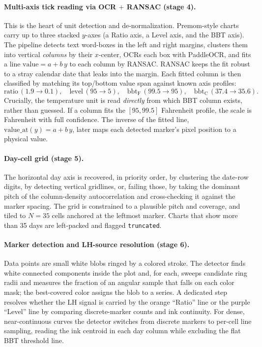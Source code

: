 \documentclass[11pt,a4paper]{article}
\newcommand{\code}[1]{\texttt{\small #1}}
\begin{document}
\paragraph{Multi-axis tick reading via OCR $+$ RANSAC (stage 4).}
This is the heart of unit detection and de-normalization. Premom-style
charts carry up to three stacked $y$-axes (a Ratio axis, a Level axis, and
the BBT axis). The pipeline detects text word-boxes in the left and right
margins, clusters them into vertical \emph{columns} by their $x$-center,
OCRs each box with PaddleOCR, and fits a line $\text{value} = a + b\,y$ to
each column by RANSAC. RANSAC keeps the fit robust to a stray calendar
date that leaks into the margin. Each fitted column is then classified by
matching its top/bottom value span against known axis profiles:
\[
\text{ratio}\,(1.9{\to}0.1),\quad
\text{level}\,(95{\to}5),\quad
\text{bbt}_{\text{F}}\,(99.5{\to}95),\quad
\text{bbt}_{\text{C}}\,(37.4{\to}35.6).
\]
Crucially, the temperature unit is read \emph{directly} from which BBT
column exists, rather than guessed. If a column fits the $[95,99.5]$
Fahrenheit profile, the scale is Fahrenheit with full confidence. The
inverse of the fitted line, $\text{value\_at}(y) = a + b\,y$, later maps
each detected marker's pixel position to a physical value.

\paragraph{Day-cell grid (stage 5).}
The horizontal day axis is recovered, in priority order, by clustering the
date-row digits, by detecting vertical gridlines, or, failing those, by
taking the dominant pitch of the column-density autocorrelation and
cross-checking it against the marker spacing. The grid is constrained to a
plausible pitch and coverage, and tiled to $N\!=\!35$ cells anchored at the
leftmost marker. Charts that show more than 35 days are left-packed and
flagged \code{truncated}.

\paragraph{Marker detection and LH-source resolution (stage 6).}
Data points are small white blobs ringed by a colored stroke. The detector finds
white connected components inside the plot and, for each, sweeps candidate ring
radii and measures the fraction of an angular sample that falls on each color
mask; the best-covered color assigns the blob to a series. A dedicated step
resolves whether the LH signal is carried by the orange ``Ratio'' line or the
purple ``Level'' line by comparing discrete-marker counts and ink continuity.
For dense, near-continuous curves the detector switches from discrete markers to
per-cell line sampling, reading the ink centroid in each day column while
excluding the flat BBT threshold line.
\end{document}
